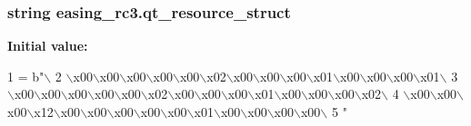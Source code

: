 \subsubsection[{qt\+\_\+resource\+\_\+struct}]{\setlength{\rightskip}{0pt plus 5cm}string easing\+\_\+rc3.\+qt\+\_\+resource\+\_\+struct}\label{namespaceeasing__rc3_a028b8ff7a046b5fb8236206ad48c71ee}
{\bfseries Initial value\+:}
\begin{DoxyCode}
1 = b\textcolor{stringliteral}{"\(\backslash\)}
2 \textcolor{stringliteral}{\(\backslash\)x00\(\backslash\)x00\(\backslash\)x00\(\backslash\)x00\(\backslash\)x00\(\backslash\)x02\(\backslash\)x00\(\backslash\)x00\(\backslash\)x00\(\backslash\)x01\(\backslash\)x00\(\backslash\)x00\(\backslash\)x00\(\backslash\)x01\(\backslash\)}
3 \textcolor{stringliteral}{\(\backslash\)x00\(\backslash\)x00\(\backslash\)x00\(\backslash\)x00\(\backslash\)x00\(\backslash\)x02\(\backslash\)x00\(\backslash\)x00\(\backslash\)x00\(\backslash\)x01\(\backslash\)x00\(\backslash\)x00\(\backslash\)x00\(\backslash\)x02\(\backslash\)}
4 \textcolor{stringliteral}{\(\backslash\)x00\(\backslash\)x00\(\backslash\)x00\(\backslash\)x12\(\backslash\)x00\(\backslash\)x00\(\backslash\)x00\(\backslash\)x00\(\backslash\)x00\(\backslash\)x01\(\backslash\)x00\(\backslash\)x00\(\backslash\)x00\(\backslash\)x00\(\backslash\)}
5 \textcolor{stringliteral}{"}
\end{DoxyCode}

